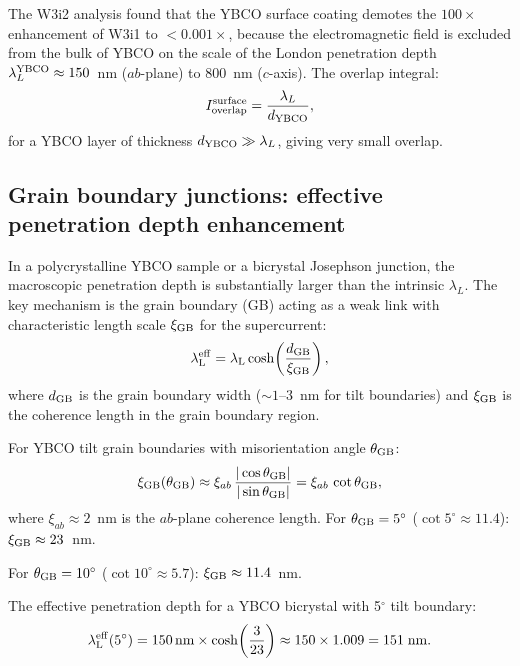 \documentclass[11pt]{article}
\newcommand{\lambdaL}{\lambda_{\rm L}}
\begin{document}
The W3i2 analysis found that the YBCO surface coating demotes the $100\times$
enhancement of W3i1 to $<0.001\times$, because the electromagnetic field
is excluded from the bulk of YBCO on the scale of the London penetration depth
$\lambda_L^{\rm YBCO} \approx 150$~nm ($ab$-plane) to 800~nm ($c$-axis).
The overlap integral:
\begin{equation}
I_{\rm overlap}^{\rm surface} = \frac{\lambda_L}{d_{\rm YBCO}},
\label{eq:overlap-surface}
\end{equation}
for a YBCO layer of thickness $d_{\rm YBCO} \gg \lambda_L$, giving very small
overlap.

\subsection{Grain boundary junctions: effective penetration depth enhancement}

In a polycrystalline YBCO sample or a bicrystal Josephson junction, the
macroscopic penetration depth is substantially larger than the intrinsic
$\lambda_L$. The key mechanism is the grain boundary (GB) acting as a weak
link with characteristic length scale $\xi_{\rm GB}$ for the supercurrent:
\begin{equation}
\lambdaL^{\rm eff} = \lambdaL \cosh\!\left(\frac{d_{\rm GB}}{\xi_{\rm GB}}\right),
\label{eq:lambdaL-eff}
\end{equation}
where $d_{\rm GB}$ is the grain boundary width ($\sim 1$--$3$~nm for tilt
boundaries) and $\xi_{\rm GB}$ is the coherence length in the grain boundary
region.

For YBCO tilt grain boundaries with misorientation angle $\theta_{\rm GB}$:
\begin{equation}
\xi_{\rm GB}(\theta_{\rm GB}) \approx \xi_{ab}\,\frac{|\cos\theta_{\rm GB}|}{|\sin\theta_{\rm GB}|}
= \xi_{ab}\,\cot\theta_{\rm GB},
\label{eq:xi-GB}
\end{equation}
where $\xi_{ab} \approx 2$~nm is the $ab$-plane coherence length. For
$\theta_{\rm GB} = 5^\circ$ ($\cot 5^\circ \approx 11.4$):
$\xi_{\rm GB} \approx 23$~nm.

For $\theta_{\rm GB} = 10^\circ$ ($\cot 10^\circ \approx 5.7$):
$\xi_{\rm GB} \approx 11.4$~nm.

The effective penetration depth for a YBCO bicrystal with 5$^\circ$ tilt
boundary:
\begin{equation}
\lambdaL^{\rm eff}(5^\circ) = 150\,\text{nm} \times
  \cosh\!\left(\frac{3}{23}\right) \approx 150 \times 1.009 = 151\;\text{nm}.
\label{eq:lambdaL-5deg}
\end{equation}
\end{document}

